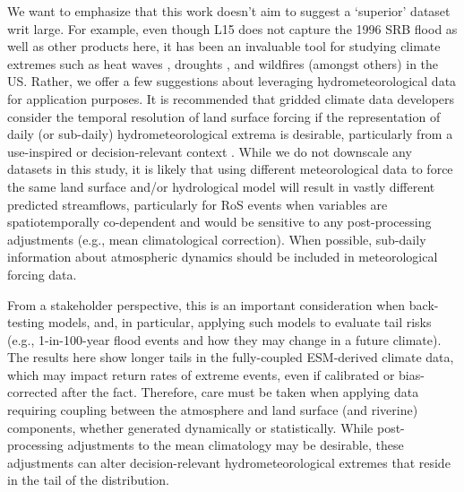 \documentclass[nhess, manuscript]{copernicus}
\begin{document}
We want to emphasize that this work doesn't aim to suggest a `superior' dataset writ large. For example, even though L15 does not capture the 1996 SRB flood as well as other products here, it has been an invaluable tool for studying climate extremes such as heat waves \citep{mazdiyasni2015substantial}, droughts \citep{pendergrass2020flash,williams2020large}, and wildfires \citep{williams2019observed} (amongst others) in the US.
Rather, we offer a few suggestions about leveraging hydrometeorological data for application purposes.
It is recommended that gridded climate data developers consider the temporal resolution of land surface forcing if the representation of daily (or sub-daily) hydrometeorological extrema is desirable, particularly from a use-inspired or decision-relevant context \citep{Jagannathan2021}.
While we do not downscale any datasets in this study, it is likely that using different meteorological data to force the same land surface and/or hydrological model will result in vastly different predicted streamflows, particularly for RoS events when variables are spatiotemporally co-dependent and would be sensitive to any post-processing adjustments (e.g., mean climatological correction). When possible, sub-daily information about atmospheric dynamics should be included in meteorological forcing data.

From a stakeholder perspective, this is an important consideration when back-testing models, and, in particular, applying such models to evaluate tail risks (e.g., 1-in-100-year flood events and how they may change in a future climate).
The results here show longer tails in the fully-coupled ESM-derived climate data, which may impact return rates of extreme events, even if calibrated or bias-corrected after the fact.
Therefore, care must be taken when applying data requiring coupling between the atmosphere and land surface (and riverine) components, whether generated dynamically or statistically.
While post-processing adjustments to the mean climatology may be desirable, these adjustments can alter decision-relevant hydrometeorological extremes that reside in the tail of the distribution.




\end{document}
